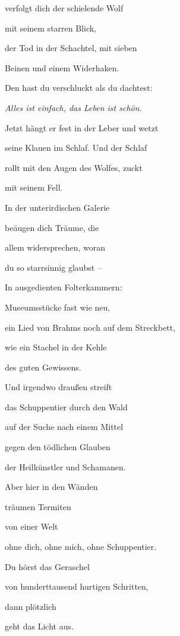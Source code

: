 \documentclass[a4paper]{article}
\begin{document}
verfolgt dich der schielende Wolf

mit seinem starren Blick,

der Tod in der Schachtel, mit sieben 

Beinen und einem Widerhaken. 

Den hast du verschluckt als du dachtest:

\textit{Alles ist einfach, das Leben ist schön}.

Jetzt hängt er fest in der Leber und wetzt

seine Klauen im Schlaf. Und der Schlaf 

rollt mit den Augen des Wolfes, zuckt 

mit seinem Fell.


\bigskip

In der unterirdischen Galerie 

beäugen dich Träume, die 

allem widersprechen, woran 

du so starrsinnig glaubst – 

In ausgedienten Folterkammern:

Museumsstücke fast wie neu,

ein Lied von Brahms noch auf dem Streckbett,

wie ein Stachel in der Kehle

des guten Gewissens.


\bigskip

Und irgendwo draußen streift 

das Schuppentier durch den Wald

auf der Suche nach einem Mittel 

gegen den tödlichen Glauben 

der Heilkünstler und Schamanen.


\bigskip

Aber hier in den Wänden

träumen Termiten 

von einer Welt

ohne dich, ohne mich, ohne Schuppentier.


\bigskip

Du hörst das Geraschel

von hunderttausend hurtigen Schritten, 

dann plötzlich 

geht das Licht aus.


\bigskip

\clearpage
\bigskip
\end{document}
